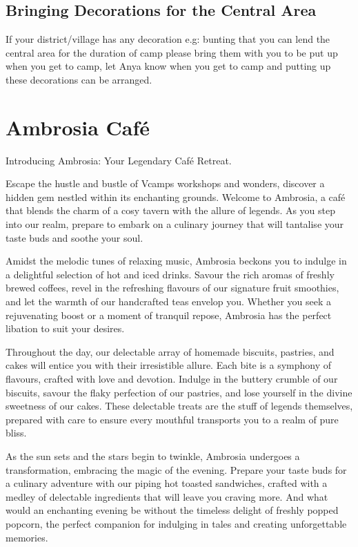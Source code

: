 \documentclass[a4paper, 11pt]{report}
\begin{document}
\section{Bringing Decorations for the Central Area}
If your district/village has any decoration e.g: bunting that you can lend the central area for the duration of camp please bring them with you to be put up when you get to camp, let Anya know when you get to camp and putting up these decorations can be arranged. 

\chapter{Ambrosia Café}
Introducing Ambrosia: Your Legendary Café Retreat.\nl

Escape the hustle and bustle of Vcamps workshops and wonders, discover a hidden gem nestled within its enchanting grounds. Welcome to Ambrosia, a café that blends the charm of a cosy tavern with the allure of legends. As you step into our realm, prepare to embark on a culinary journey that will tantalise your taste buds and soothe your soul.\nl

Amidst the melodic tunes of relaxing music, Ambrosia beckons you to indulge in a delightful selection of hot and iced drinks. Savour the rich aromas of freshly brewed coffees, revel in the refreshing flavours of our signature fruit smoothies, and let the warmth of our handcrafted teas envelop you. Whether you seek a rejuvenating boost or a moment of tranquil repose, Ambrosia has the perfect libation to suit your desires.\nl

Throughout the day, our delectable array of homemade biscuits, pastries, and cakes will entice you with their irresistible allure. Each bite is a symphony of flavours, crafted with love and devotion. Indulge in the buttery crumble of our biscuits, savour the flaky perfection of our pastries, and lose yourself in the divine sweetness of our cakes. These delectable treats are the stuff of legends themselves, prepared with care to ensure every mouthful transports you to a realm of pure bliss.\nl

As the sun sets and the stars begin to twinkle, Ambrosia undergoes a transformation, embracing the magic of the evening. Prepare your taste buds for a culinary adventure with our piping hot toasted sandwiches, crafted with a medley of delectable ingredients that will leave you craving more. And what would an enchanting evening be without the timeless delight of freshly popped popcorn, the perfect companion for indulging in tales and creating unforgettable memories.\nl
\end{document}
